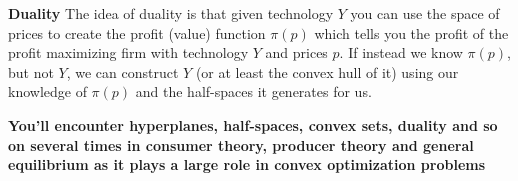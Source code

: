 \documentclass[a4paper,12pt]{article}
\begin{document}
\textbf{Duality}  The idea of duality is that given technology $Y$ you can use the space of prices to create the profit (value) function $\pi(p)$ which tells you the profit of the profit maximizing firm with technology $Y$ and prices $p$.
If instead we know $\pi(p)$, but not $Y$, we can construct $Y$ (or at least the convex hull of it) using our knowledge of $\pi(p)$ and the half-spaces it generates for us.

\textbf{You'll encounter hyperplanes, half-spaces, convex sets, duality and so on several times in consumer theory, producer theory and general equilibrium as it plays a large role in convex optimization problems}
\end{document}

